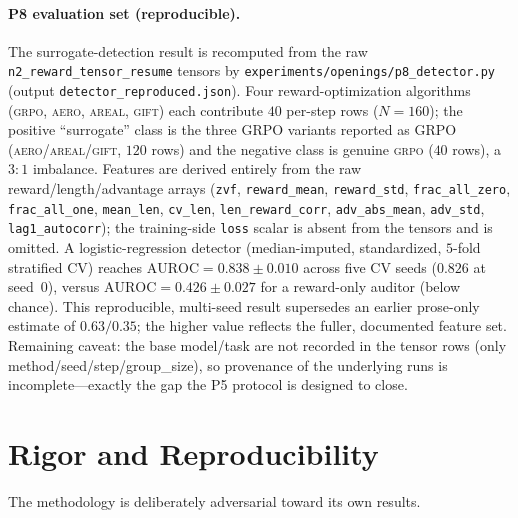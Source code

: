 \documentclass[12pt,a4paper]{report}
\begin{document}
\paragraph{P8 evaluation set (reproducible).} The surrogate-detection result is recomputed from the raw \texttt{n2\_reward\_tensor\_resume} tensors by \texttt{experiments/openings/p8\_detector.py} (output \texttt{detector\_reproduced.json}). Four reward-optimization algorithms (\textsc{grpo}, \textsc{aero}, \textsc{areal}, \textsc{gift}) each contribute $40$ per-step rows ($N=160$); the positive ``surrogate'' class is the three GRPO variants reported as GRPO (\textsc{aero}/\textsc{areal}/\textsc{gift}, $120$ rows) and the negative class is genuine \textsc{grpo} ($40$ rows), a $3{:}1$ imbalance. Features are derived entirely from the raw reward/length/advantage arrays (\texttt{zvf}, \texttt{reward\_mean}, \texttt{reward\_std}, \texttt{frac\_all\_zero}, \texttt{frac\_all\_one}, \texttt{mean\_len}, \texttt{cv\_len}, \texttt{len\_reward\_corr}, \texttt{adv\_abs\_mean}, \texttt{adv\_std}, \texttt{lag1\_autocorr}); the training-side \texttt{loss} scalar is absent from the tensors and is omitted. A logistic-regression detector (median-imputed, standardized, $5$-fold stratified CV) reaches $\mathrm{AUROC}=0.838\pm0.010$ across five CV seeds ($0.826$ at seed~0), versus $\mathrm{AUROC}=0.426\pm0.027$ for a reward-only auditor (below chance). This reproducible, multi-seed result supersedes an earlier prose-only estimate of $0.63/0.35$; the higher value reflects the fuller, documented feature set. Remaining caveat: the base model/task are not recorded in the tensor rows (only method/seed/step/group\_size), so provenance of the underlying runs is incomplete---exactly the gap the P5 protocol is designed to close.

\section{Rigor and Reproducibility}
\label{sec:rigor}

The methodology is deliberately adversarial toward its own results.
\end{document}
